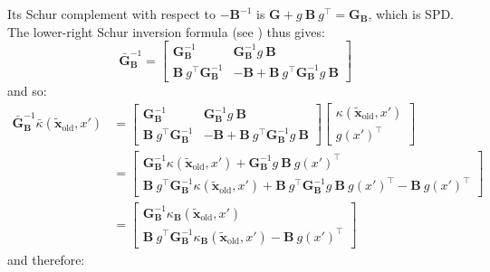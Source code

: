 Its Schur complement with respect to $-\mathbf{B}^{-1}$ is $\mathbf{G}+g\:\mathbf{B}\:g^\top=\mathbf{G}_{\mathbf{B}}$, which is SPD. The lower-right Schur inversion formula (see ) thus gives:
\begin{equation}
	\bar{\mathbf{G}}_{\mathbf{B}}^{-1}=\begin{bmatrix}\mathbf{G}_{\mathbf{B}}^{-1}&\mathbf{G}_{\mathbf{B}}^{-1}g\:\mathbf{B}\\\mathbf{B}\:g^\top \mathbf{G}_{\mathbf{B}}^{-1}&-\mathbf{B}+\mathbf{B}\:g^\top \mathbf{G}_{\mathbf{B}}^{-1}g\:\mathbf{B}\end{bmatrix}
\end{equation}
and so:
\begin{equation}
	\begin{aligned}
	\bar{\mathbf{G}}_{\mathbf{B}}^{-1}\bar{\kappa}(\tilde{\mathbf{x}}_{\mathrm{old}},x')&=\begin{bmatrix}\mathbf{G}_{\mathbf{B}}^{-1}&\mathbf{G}_{\mathbf{B}}^{-1}g\:\mathbf{B}\\\mathbf{B}\:g^\top \mathbf{G}_{\mathbf{B}}^{-1}&-\mathbf{B}+\mathbf{B}\:g^\top \mathbf{G}_{\mathbf{B}}^{-1}g\:\mathbf{B}\end{bmatrix}\begin{bmatrix}\kappa(\tilde{\mathbf{x}}_{\mathrm{old}},x')\\g(x')^\top\end{bmatrix}\\
	&=\begin{bmatrix}\mathbf{G}_{\mathbf{B}}^{-1}\kappa(\tilde{\mathbf{x}}_{\mathrm{old}},x')+\mathbf{G}_{\mathbf{B}}^{-1}g\:\mathbf{B}\:g(x')^\top\\\mathbf{B}\:g^\top \mathbf{G}_{\mathbf{B}}^{-1}\kappa(\tilde{\mathbf{x}}_{\mathrm{old}},x')+\mathbf{B}\:g^\top \mathbf{G}_{\mathbf{B}}^{-1}g\:\mathbf{B}\:g(x')^\top-\mathbf{B}\:g(x')^\top\end{bmatrix}\\
	&=\begin{bmatrix}\mathbf{G}_{\mathbf{B}}^{-1}\kappa_{\mathbf{B}}(\tilde{\mathbf{x}}_{\mathrm{old}},x')\\\mathbf{B}\:g^\top \mathbf{G}_{\mathbf{B}}^{-1}\kappa_{\mathbf{B}}(\tilde{\mathbf{x}}_{\mathrm{old}},x')-\mathbf{B}\:g(x')^\top\end{bmatrix}
	\end{aligned}
\end{equation}
and therefore:

